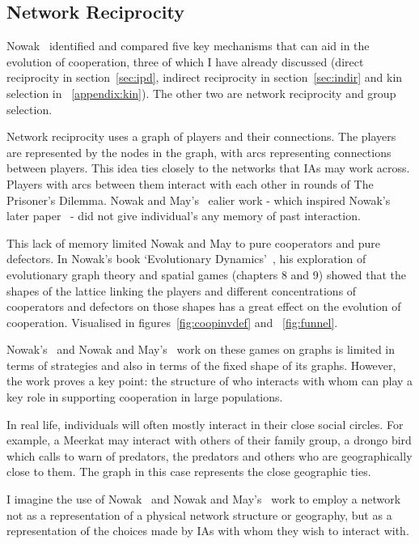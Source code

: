 \documentclass[]{final_report}
\begin{document}
\subsection{Network Reciprocity}
\label{appendix:netreciprocity}
Nowak~\cite{five_rules_coop} identified and compared five key mechanisms that can aid in the evolution of cooperation, three of which I have already discussed (direct reciprocity in section~\ref{sec:ipd}, indirect reciprocity in section~\ref{sec:indir} and kin selection in ~\ref{appendix:kin}). The other two are network reciprocity and group selection.\par
Network reciprocity uses a graph of players and their connections. The players are represented by the nodes in the graph, with arcs representing connections between players. This idea ties closely to the networks that IAs may work across. Players with arcs between them interact with each other in rounds of The Prisoner's Dilemma. Nowak and May's~\cite{spatial} ealier work - which inspired Nowak's later paper~\cite{five_rules_coop} - did not give individual's any memory of past interaction.\par
This lack of memory limited Nowak and May to pure cooperators and pure defectors. In Nowak's book `Evolutionary Dynamics'~\cite{nowak2006evolutionary}, his exploration of evolutionary graph theory and spatial games (chapters 8 and 9) showed that the shapes of the lattice linking the players and different concentrations of cooperators and defectors on those shapes has a great effect on the evolution of cooperation. Visualised in figures~\ref{fig:coopinvdef} and ~\ref{fig:funnel}.\par
Nowak's~\cite{five_rules_coop, nowak2006evolutionary} and Nowak and May's~\cite{spatial} work on these games on graphs is limited in terms of strategies and also in terms of the fixed shape of its graphs. However, the work proves a key point: the structure of who interacts with whom can play a key role in supporting cooperation in large populations.\par
In real life, individuals will often mostly interact in their close social circles. For example, a Meerkat may interact with others of their family group, a drongo bird which calls to warn of predators, the predators and others who are geographically close to them. The graph in this case represents the close geographic ties.\par 
I imagine the use of Nowak~\cite{five_rules_coop, nowak2006evolutionary} and Nowak and May's~\cite{spatial} work to employ a network not as a representation of a physical network structure or geography, but as a representation of the choices made by IAs with whom they wish to interact with.\par
\end{document}

